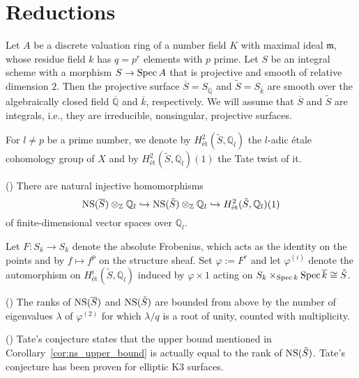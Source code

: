 \documentclass[main]{subfiles}
\begin{document}
\section{Reductions}
\label{sec:reduction}

Let $A$ be a discrete valuation ring of a number field $K$ with maximal ideal $\mathfrak{m}$, whose residue field $k$ has $q=p^r$ elements with $p$ prime.
Let $S$ be an integral scheme with a morphism $S \to \operatorname{Spec} A$ that is projective and smooth of relative dimension $2$.
Then the projective surface $\overline{S}=S_{\overline{\mathbb{Q}}}$ and $\tilde{S}=S_{\overline{k}}$ are smooth over the algebraically closed field $\overline{\mathbb{Q}}$ and $\overline{k}$, respectively.
We will assume that $\overline{S}$ and $\tilde{S}$ are integrals, i.e., they are irreducible, nonsingular, projective surfaces.

For $l \neq p$ be a prime number, we denote by $H_{\text{\'et}}^{2}(\tilde{S}, \mathbb{Q}_l)$ the $l$-adic \'etale cohomology group of $X$ and by $H_{\text{\'et}}^{2}(\tilde{S}, \mathbb{Q}_l)(1)$ the Tate twist of it.

\begin{thm}{(\cite[Proposition 6.2.]{ref:vanluijk2007})}
    There are natural injective homomorphisms
    \begin{equation*}
        \operatorname{NS} (\overline{S}) \otimes_{\mathbb{Z}} \mathbb{Q}_{l} \hookrightarrow \operatorname{NS} (\tilde{S}) \otimes_{\mathbb{Z}} \mathbb{Q}_{l} \hookrightarrow H_{\text{\'et}}^{2}(\tilde{S}, \mathbb{Q}_{l})(1)
    \end{equation*}
    of finite-dimensional vector spaces over $\mathbb{Q}_l$.
\end{thm}

Let $F: S_k \to S_k$ denote the absolute Frobenius, which acts as the identity on the points and by $f \mapsto f^p$ on the structure sheaf.
Set $\varphi:=F^{r}$ and let $\varphi^{(i)}$ denote the automorphism on $H_{\text{\'et}}^{i}(\tilde{S}, \mathbb{Q}_l)$ induced by $\varphi \times 1$ acting on $S_k \times_{\operatorname{Spec} k} \operatorname{Spec} \overline{k} \cong \tilde{S}$.

\begin{cor}{(\cite[Corollary 6.4.]{ref:vanluijk2007})}
    \label{cor:ns_upper_bound}
    The ranks of $\operatorname{NS} (\overline{S})$ and $\operatorname{NS} (\tilde{S})$ are bounded from above by the number of eigenvalues $\lambda$ of $\varphi^{(2)}$ for which $\lambda/q$ is a root of unity, counted with multiplicity.
\end{cor}

\begin{rem}{(\cite[Remark 6.5.]{ref:vanluijk2007})}
    Tate's conjecture states that the upper bound mentioned in Corollary~\ref{cor:ns_upper_bound} is actually equal to the rank of $\operatorname{NS} (\tilde{S})$.
    Tate's conjecture has been proven for elliptic K3 surfaces.
\end{rem}
\end{document}
